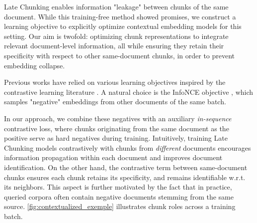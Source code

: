 
Late Chunking enables information "leakage" between chunks of the same document. While this training-free method showed promises, we construct a learning objective to explicitly optimize contextual embedding models for this setting.
Our aim is twofold: optimizing chunk representations to integrate relevant document-level information, all while ensuring they retain their specificity with respect to other same-document chunks, in order to prevent embedding collapse.

Previous works  have relied on various learning objectives inspired by the contrastive learning literature . A natural choice is the InfoNCE objective , which samples "negative" embeddings from other documents of the same batch. 


In our approach, we combine these negatives with an auxiliary \textit{in-sequence} contrastive loss, where chunks originating from the same document as the positive serve as hard negatives during training. 
Intuitively, training Late Chunking models contrastively with chunks from \emph{different} documents encourages information propagation within each document and improves document identification. On the other hand, the contrastive term between same-document chunks ensures each chunk retains its specificity, and remains identifiable w.r.t. its neighbors. This aspect is further motivated by the fact that in practice, queried corpora often contain negative documents stemming from the same source. \autoref{fig:contextualized_exemple} illustrates chunk roles across a training batch.

